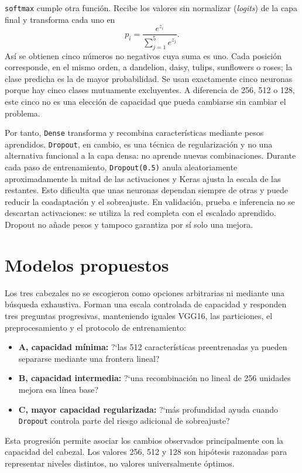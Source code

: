\documentclass[11pt,letterpaper]{article}
\begin{document}
\texttt{softmax} cumple otra función. Recibe los valores sin normalizar
(\emph{logits}) de la capa final y transforma cada uno en
\[
p_i=\frac{e^{z_i}}{\sum_{j=1}^{5}e^{z_j}}.
\]
Así se obtienen cinco números no negativos cuya suma es uno. Cada posición
corresponde, en el mismo orden, a dandelion, daisy, tulips, sunflowers o roses;
la clase predicha es la de mayor probabilidad. Se usan exactamente cinco
neuronas porque hay cinco clases mutuamente excluyentes. A diferencia de 256,
512 o 128, este cinco no es una elección de capacidad que pueda cambiarse sin
cambiar el problema.

Por tanto, \texttt{Dense} transforma y recombina características mediante
pesos aprendidos. \texttt{Dropout}, en cambio, es una técnica de
regularización y no una alternativa funcional a la capa densa: no aprende
nuevas combinaciones. Durante cada paso de entrenamiento,
\texttt{Dropout(0.5)}
anula aleatoriamente aproximadamente la mitad de las activaciones y Keras
ajusta la escala de las restantes. Esto dificulta que unas neuronas dependan
siempre de otras y puede reducir la coadaptación y el sobreajuste. En
validación, prueba e inferencia no se descartan activaciones: se utiliza la red
completa con el escalado aprendido. Dropout no añade pesos y tampoco garantiza
por sí solo una mejora.

\section{Modelos propuestos}
Los tres cabezales no se escogieron como opciones arbitrarias ni mediante una
búsqueda exhaustiva. Forman una escala controlada de capacidad y responden
tres preguntas progresivas, manteniendo iguales VGG16, las particiones, el
preprocesamiento y el protocolo de entrenamiento:

\begin{itemize}
\item \textbf{A, capacidad mínima:} ?`las 512 características preentrenadas ya
pueden separarse mediante una frontera lineal?
\item \textbf{B, capacidad intermedia:} ?`una recombinación no lineal de 256
unidades mejora esa línea base?
\item \textbf{C, mayor capacidad regularizada:} ?`más profundidad ayuda cuando
\texttt{Dropout} controla parte del riesgo adicional de sobreajuste?
\end{itemize}

Esta progresión permite asociar los cambios observados principalmente con la
capacidad del cabezal. Los valores 256, 512 y 128 son hipótesis razonadas para
representar niveles distintos, no valores universalmente óptimos.
\end{document}
